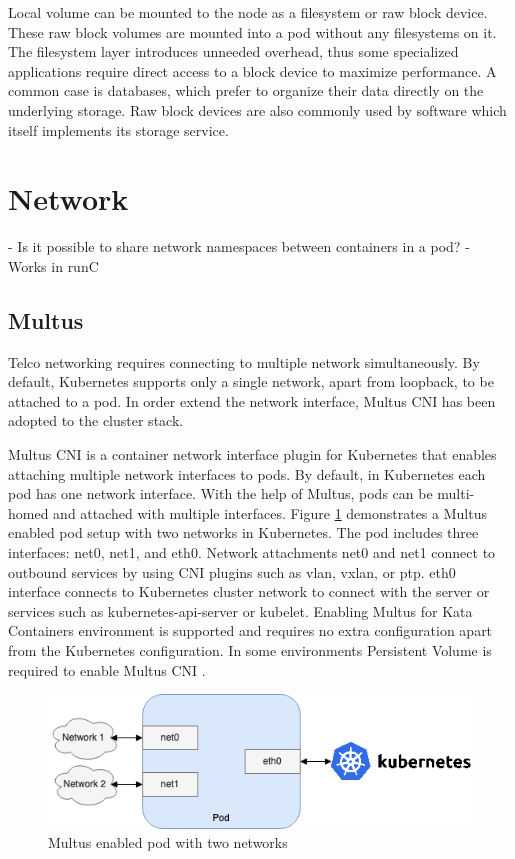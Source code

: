 Local volume can be mounted to the node as a filesystem or raw block device. These raw block volumes are mounted into a pod without any filesystems on it. The filesystem layer introduces unneeded overhead, thus some specialized applications require direct access to a block device to maximize performance. A common case is databases, which prefer to organize their data directly on the underlying storage. Raw block devices are also commonly used by software which itself implements its storage service. \cite{RawBlockKubernetes}


\section{Network}

- Is it possible to share network namespaces between containers in a pod?
	- Works in runC

\subsection{Multus}

Telco networking requires connecting to multiple network simultaneously. By default, Kubernetes supports only a single network, apart from loopback, to be attached to a pod. In order extend the network interface, Multus CNI has been adopted to the cluster stack.

Multus CNI \cite{Multus} is a container network interface plugin for Kubernetes that enables attaching multiple network interfaces to pods. By default, in Kubernetes each pod has one network interface. With the help of Multus, pods can be multi-homed and attached with multiple interfaces. Figure \ref{fig:Multus} demonstrates a Multus enabled pod setup with two networks in Kubernetes. The pod includes three interfaces: net0, net1, and eth0. Network attachments net0 and net1 connect to outbound services by using CNI plugins such as vlan, vxlan, or ptp. eth0 interface connects to Kubernetes cluster network to connect with the server or services such as kubernetes-api-server or kubelet. Enabling Multus for Kata Containers environment is supported and requires no extra configuration apart from the Kubernetes configuration. In some environments Persistent Volume is required to enable Multus CNI \cite{MultusUbuntu}.

\begin{figure}[ht]
  \begin{center}
    \includegraphics[width=13.5cm]{images/Multus.png}
    \caption{Multus enabled pod with two networks}
    \label{fig:Multus}
  \end{center}
\end{figure}

